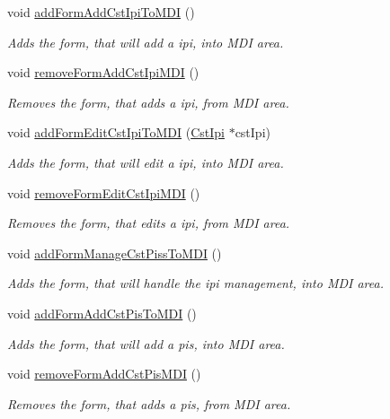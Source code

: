 \begin{DoxyCompactItemize}
void \hyperlink{class_main_window_a73d33f3952cb878de35b6794327990b1}{add\-Form\-Add\-Cst\-Ipi\-To\-M\-D\-I} ()
\begin{DoxyCompactList}\small\item\em \-Adds the form, that will add a ipi, into \-M\-D\-I area. \end{DoxyCompactList}\item 
void \hyperlink{class_main_window_ab4f866cf49cb3167db9c2690dc31e7bd}{remove\-Form\-Add\-Cst\-Ipi\-M\-D\-I} ()
\begin{DoxyCompactList}\small\item\em \-Removes the form, that adds a ipi, from \-M\-D\-I area. \end{DoxyCompactList}\item 
void \hyperlink{class_main_window_a4aa98435db018cbf22136872f3b18bc7}{add\-Form\-Edit\-Cst\-Ipi\-To\-M\-D\-I} (\hyperlink{class_cst_ipi}{\-Cst\-Ipi} $\ast$cst\-Ipi)
\begin{DoxyCompactList}\small\item\em \-Adds the form, that will edit a ipi, into \-M\-D\-I area. \end{DoxyCompactList}\item 
void \hyperlink{class_main_window_a52e93a12f2b656182bc0744c274a3646}{remove\-Form\-Edit\-Cst\-Ipi\-M\-D\-I} ()
\begin{DoxyCompactList}\small\item\em \-Removes the form, that edits a ipi, from \-M\-D\-I area. \end{DoxyCompactList}\item 
void \hyperlink{class_main_window_a5af909c81673a5374805d5a79f55a3ba}{add\-Form\-Manage\-Cst\-Piss\-To\-M\-D\-I} ()
\begin{DoxyCompactList}\small\item\em \-Adds the form, that will handle the ipi management, into \-M\-D\-I area. \end{DoxyCompactList}\item 
void \hyperlink{class_main_window_a8802fa76b06b8d54a6677009dbd8d523}{add\-Form\-Add\-Cst\-Pis\-To\-M\-D\-I} ()
\begin{DoxyCompactList}\small\item\em \-Adds the form, that will add a pis, into \-M\-D\-I area. \end{DoxyCompactList}\item 
void \hyperlink{class_main_window_aaffa323cfbdfa8a4da6712deee5105fc}{remove\-Form\-Add\-Cst\-Pis\-M\-D\-I} ()
\begin{DoxyCompactList}\small\item\em \-Removes the form, that adds a pis, from \-M\-D\-I area. \end{DoxyCompactList}\item 

\end{DoxyCompactItemize}
